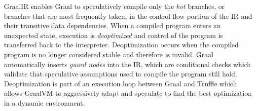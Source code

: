GraalIR enables Graal to speculatively compile only the \textit{hot} branches\cite{graalvm:speculative-ir}, or branches that are most frequently taken, in the control flow portion of the IR and their transitive data dependencies.
When a compiled program enters an unexpected state, execution is \textit{deoptimized} and control of the program is transferred back to the interpreter.
Deoptimization occurs when the compiled program is no longer considered stable and therefore is invalid.
Graal automatically inserts \textit{guard nodes} into the IR, which are conditional checks which validate that speculative assumptions used to compile the program still hold.
Deoptimization is part of an execution loop between Graal and Truffle which allows GraalVM to aggressively adapt and speculate to find the best optimization in a dynamic environment.


